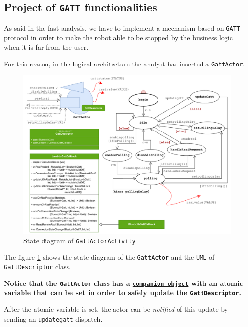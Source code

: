 \subsection{Project of \texttt{GATT} functionalities}

As said in the fast analysis, we have to implement a mechanism based on \texttt{GATT} protocol in order to make the robot able to be stopped by the business logic when it is far from the user.

For this reason, in the logical architecture the analyst has inserted a \texttt{GattActor}.

\begin{figure}[h!]
	\centering
	\includegraphics[width=\textwidth]{img/gattactor.pdf}
	\caption{State diagram of \texttt{GattActorActivity}}
	\label{fig:gattactor}
\end{figure}

The figure \ref{fig:gattactor} shows the state diagram of the \texttt{GattActor} and the \texttt{UML} of \texttt{GattDescriptor} class.

\textbf{Notice that the \texttt{GattActor} class has a \href{https://kotlinlang.org/docs/object-declarations.html\#companion-objects}{\texttt{companion object}} with an atomic variable that can be set in order to safely update the \texttt{GattDescriptor}.}

After the atomic variable is set, the actor can be \textit{notified} of this update by sending an \texttt{updategatt} dispatch.

